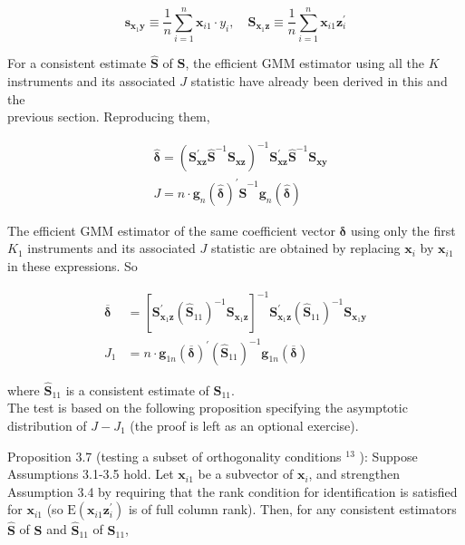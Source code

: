 \documentclass[10pt]{article}
\begin{document}
\begin{equation*}
\mathbf{s}_{\mathbf{x}_{1} \mathbf{y}} \equiv \frac{1}{n} \sum_{i=1}^{n} \mathbf{x}_{i 1} \cdot y_{i}, \quad \mathbf{S}_{\mathbf{x}_{1} \mathbf{z}} \equiv \frac{1}{n} \sum_{i=1}^{n} \mathbf{x}_{i 1} \mathbf{z}_{i}^{\prime} \tag{3.6.6}
\end{equation*}


For a consistent estimate $\widehat{\mathbf{S}}$ of $\mathbf{S}$, the efficient GMM estimator using all the $K$ instruments and its associated $J$ statistic have already been derived in this and the\\
previous section. Reproducing them,


\begin{align*}
& \hat{\boldsymbol{\delta}}=\left(\mathbf{S}_{\mathbf{x z}}^{\prime} \widehat{\mathbf{S}}^{-1} \mathbf{S}_{\mathbf{x z}}\right)^{-1} \mathbf{S}_{\mathbf{x z}}^{\prime} \widehat{\mathbf{S}}^{-1} \mathbf{S}_{\mathbf{x y}}  \tag{3.6.7}\\
& J=n \cdot \mathbf{g}_{n}(\hat{\boldsymbol{\delta}})^{\prime} \widehat{\mathbf{S}}^{-1} \mathbf{g}_{n}(\hat{\boldsymbol{\delta}}) \tag{3.6.8}
\end{align*}


The efficient GMM estimator of the same coefficient vector $\boldsymbol{\delta}$ using only the first $K_{1}$ instruments and its associated $J$ statistic are obtained by replacing $\mathbf{x}_{i}$ by $\mathbf{x}_{i 1}$ in these expressions. So


\begin{align*}
\overline{\boldsymbol{\delta}} & =\left[\mathbf{S}_{\mathbf{x}_{1} \mathbf{z}}^{\prime}\left(\widehat{\mathbf{S}}_{11}\right)^{-1} \mathbf{S}_{\mathbf{x}_{1} \mathbf{z}}\right]^{-1} \mathbf{S}_{\mathbf{x}_{1} \mathbf{z}}^{\prime}\left(\widehat{\mathbf{S}}_{11}\right)^{-1} \mathbf{S}_{\mathbf{x}_{1} \mathbf{y}}  \tag{3.6.9}\\
J_{1} & =n \cdot \mathbf{g}_{1 n}(\overline{\boldsymbol{\delta}})^{\prime}\left(\widehat{\mathbf{S}}_{11}\right)^{-1} \mathbf{g}_{1 n}(\overline{\boldsymbol{\delta}}) \tag{3.6.10}
\end{align*}


where $\widehat{\mathbf{S}}_{11}$ is a consistent estimate of $\mathbf{S}_{11}$.\\
The test is based on the following proposition specifying the asymptotic distribution of $J-J_{1}$ (the proof is left as an optional exercise).

Proposition 3.7 (testing a subset of orthogonality conditions ${ }^{13}$ ): Suppose Assumptions 3.1-3.5 hold. Let $\mathbf{x}_{i 1}$ be a subvector of $\mathbf{x}_{i}$, and strengthen Assumption 3.4 by requiring that the rank condition for identification is satisfied for $\mathbf{x}_{i 1}$ (so $\mathrm{E}\left(\mathbf{x}_{i 1} \mathbf{z}_{i}^{\prime}\right)$ is of full column rank). Then, for any consistent estimators $\widehat{\mathbf{S}}$ of $\mathbf{S}$ and $\widehat{\mathbf{S}}_{11}$ of $\mathbf{S}_{11}$,
\end{document}
